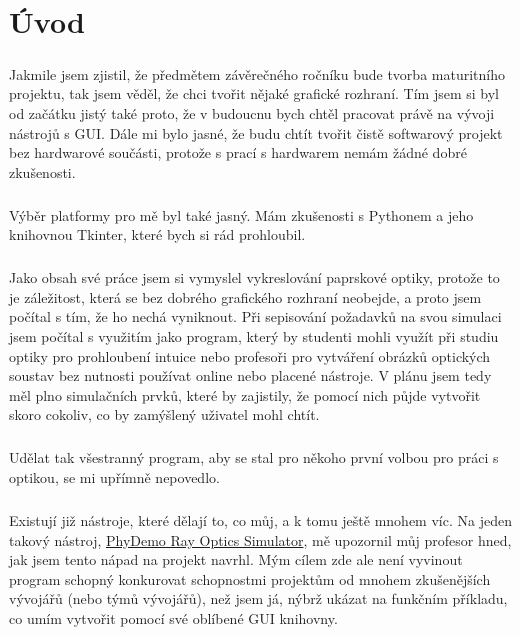 \documentclass[12pt,a4paper]{report}
\begin{document}
\setcounter{tocdepth}{2} %
\tableofcontents
\newpage
{}

\chapter{Úvod}
\paragraph{} Jakmile jsem zjistil, že předmětem závěrečného ročníku bude tvorba maturitního projektu, tak jsem věděl, že chci tvořit nějaké grafické rozhraní. Tím jsem si byl od začátku jistý také proto, že v budoucnu bych chtěl pracovat právě na vývoji nástrojů s GUI. Dále mi bylo jasné, že budu chtít tvořit čistě softwarový projekt bez hardwarové součásti, protože s prací s hardwarem nemám žádné dobré zkušenosti.
\paragraph{} Výběr platformy pro mě byl také jasný. Mám zkušenosti s Pythonem a jeho knihovnou Tkinter, které bych si rád prohloubil.
\paragraph{} Jako obsah své práce jsem si vymyslel vykreslování paprskové optiky, protože to je záležitost, která se bez dobrého grafického rozhraní neobejde, a proto jsem počítal s tím, že ho nechá vyniknout. Při sepisování požadavků na svou simulaci jsem počítal s využitím jako program, který by studenti mohli využít při studiu optiky pro prohloubení intuice nebo profesoři pro vytváření obrázků optických soustav bez nutnosti používat online nebo placené nástroje. V plánu jsem tedy měl plno simulačních prvků, které by zajistily, že pomocí nich půjde vytvořit skoro cokoliv, co by zamýšlený uživatel mohl chtít.
\paragraph{} Udělat tak všestranný program, aby se stal pro někoho první volbou pro práci s optikou, se mi upřímně nepovedlo.
\paragraph{} Existují již nástroje, které dělají to, co můj, a k tomu ještě mnohem víc. Na jeden takový nástroj, \href{https://phydemo.app/ray-optics/simulator/}{PhyDemo Ray Optics Simulator}, mě upozornil můj profesor hned, jak jsem tento nápad na projekt navrhl. Mým cílem zde ale není vyvinout program schopný konkurovat schopnostmi projektům od mnohem zkušenějších vývojářů (nebo týmů vývojářů), než jsem já, nýbrž ukázat na funkčním příkladu, co umím vytvořit pomocí své oblíbené GUI knihovny.
\end{document}
